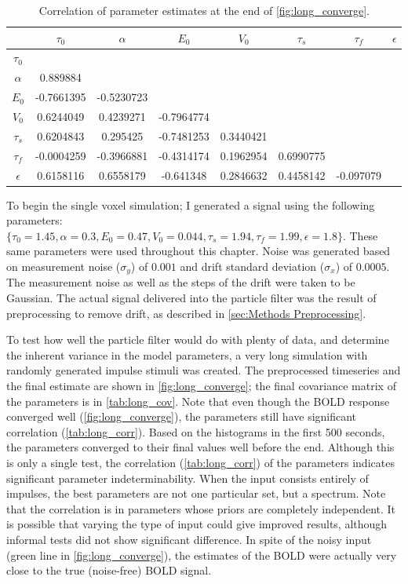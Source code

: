 \begin{table}[t]
\begin{tabular}{|c | c  c  c  c  c  c  c |}
\hline 
  & $\tau_0$ & $\alpha$ & $E_0$    & $V_0$    & $\tau_s$ & $\tau_f$ & $\epsilon$ \\
\hline 
\rowcolor[gray]{.8} $\tau_0$  & & & & & & & \\
$\alpha$                      & 0.889884 & & & & & & \\
\rowcolor[gray]{.8} $E_0$     & -0.7661395 & -0.5230723 & & & & & \\
$V_0$                         & 0.6244049 & 0.4239271 & -0.7964774 & & & & \\
\rowcolor[gray]{.8} $\tau_s$  & 0.6204843 & 0.295425 & -0.7481253 & 0.3440421 & & & \\
$\tau_f$                      & -0.0004259 & -0.3966881 & -0.4314174 & 0.1962954 & 0.6990775 & & \\
\rowcolor[gray]{.8} $\epsilon$& 0.6158116 & 0.6558179 & -0.641348 & 0.2846632 & 0.4458142 & -0.097079 & \\
\hline 
\end{tabular}
\caption{Correlation of parameter estimates at the end of \autoref{fig:long_converge}.}
\label{tab:long_corr} 
\end{table}

To begin the single voxel simulation; I generated a signal using the following parameters:
$\{\tau_0 = 1.45, \alpha = 0.3, E_0 = 0.47, V_0 = 0.044, \tau_s = 1.94, \tau_f = 1.99, \epsilon = 1.8\}$.
These same parameters were used throughout this chapter. Noise
was generated based on measurement noise ($\sigma_y$) of $0.001$ and drift standard deviation
($\sigma_x$) of $0.0005$. The measurement noise as well as the steps of the drift
were taken to be Gaussian. The actual signal delivered into the particle filter
was the result of preprocessing to remove drift, as described in 
\autoref{sec:Methods Preprocessing}. 

To test how well the particle filter would do with plenty of data, and 
determine the inherent variance in the model parameters, a very long simulation
with randomly generated impulse stimuli was created. The preprocessed timeseries
and the final estimate are shown in \autoref{fig:long_converge};
the final covariance matrix of the parameters is in \autoref{tab:long_cov}.
Note that even though the BOLD response converged well (\autoref{fig:long_converge}),
the parameters still have significant correlation (\autoref{tab:long_corr}). 
Based on the histograms in the first 500 seconds, the parameters converged to
their final values well before the end.
Although this is only a single test, the correlation (\autoref{tab:long_corr}) 
of the parameters 
indicates significant parameter indeterminability. When the input
consists entirely of impulses, the best parameters are not one particular
set, but a spectrum. Note that the correlation is in parameters whose priors
are completely independent. It is possible that varying the type of input could
give improved results, although informal tests did not show significant difference.
In spite of the noisy input (green line in \autoref{fig:long_converge}), the estimates
of the BOLD were actually very close to the true (noise-free) BOLD signal.

